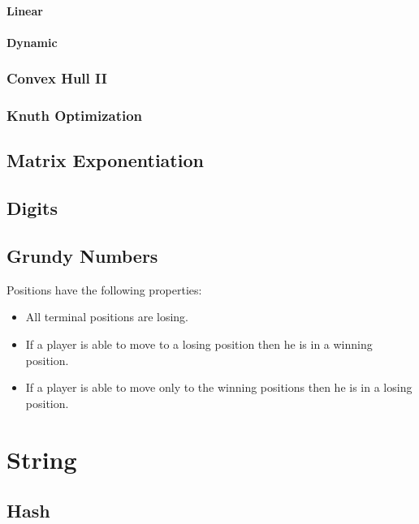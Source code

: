 \documentclass[10pt,a4paper]{report}
\begin{document}
			\subsubsection{Linear}
				
			\newpage
			\subsubsection{Dynamic}
				
		\subsection{Convex Hull II}
		\newpage
		\subsection{Knuth Optimization}
			
	\newpage
	\section{Matrix Exponentiation}
		
	\newpage
	\section{Digits}
		
	\newpage
	\section{Grundy Numbers}
		Positions have the following properties:
		\begin{itemize}
			\item All terminal positions are losing.
			\item If a player is able to move to a losing position then he is in a winning position.
			\item If a player is able to move only to the winning positions then he is in a losing position.
		\end{itemize}
		
\chapter{String}
	\section{Hash}
		
	\newpage
\end{document}
